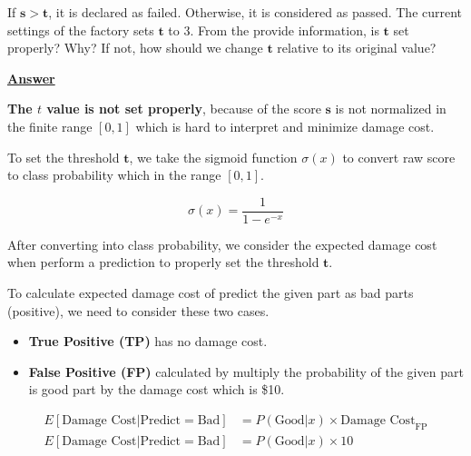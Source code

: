 \documentclass[12pt, a4paper]{article}
\begin{document}
            If $\mathbf{s > t}$, it is declared as failed. Otherwise, it is considered as passed.
            The current settings of the factory sets $\mathbf{t}$ to 3. From the provide information, is $\mathbf{t}$ set properly? Why?
            If not, how should we change $\mathbf{t}$ relative to its original value?

            \vspace{1em}

            \noindent \underline{\textbf{Answer}}

            \vspace{0.5em}

            \textbf{The $t$ value is not set properly},
            because of the score $\mathbf{s}$ is not normalized in the finite range $[0, 1]$ which is hard to interpret and minimize damage cost.

            To set the threshold $\mathbf{t}$, we take the sigmoid function $\sigma(x)$ to convert raw score to class probability which in the range $[0, 1]$.

            $$\sigma(x) = \frac{1}{1 - e^{-x}}$$

            After converting into class probability, we consider the expected damage cost when perform a prediction to properly set the threshold $\mathbf{t}$.

            To calculate expected damage cost of predict the given part as bad parts (positive), we need to consider these two cases.
            \begin{itemize}
                \item \textbf{True Positive (TP)} has no damage cost.
                \item \textbf{False Positive (FP)} calculated by multiply the probability of the given part is good part by the damage cost which is \$10.
            \end{itemize}
            \begin{align*}
                E[\text{Damage Cost} | \text{Predict} = \text{Bad}] &= P(\text{Good} | x) \times {\text{Damage Cost}}_{\text{FP}} \\
                E[\text{Damage Cost} | \text{Predict} = \text{Bad}] &= P(\text{Good} | x) \times 10 \\
            \end{align*}
\end{document}
